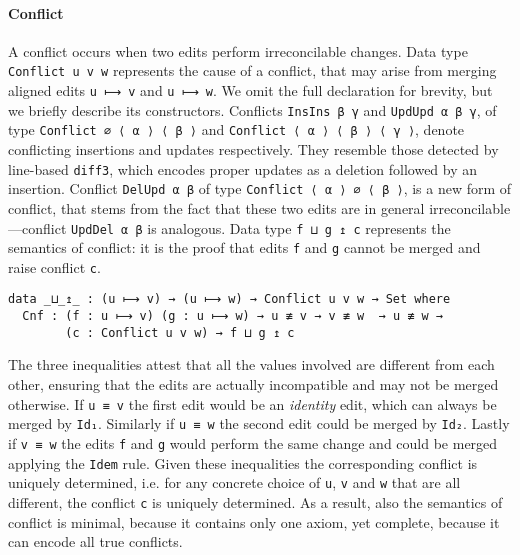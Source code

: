 \documentclass{sigplanconf}
\theoremstyle{plain}
\begin{document}
\paragraph{Conflict}
A conflict occurs when two edits perform irreconcilable changes.  
%
Data type \texttt{Conflict u v w} represents the cause of
a conflict, that may arise from merging aligned edits \texttt{u ⟼ v}
and \texttt{u ⟼ w}.
%
We omit the full declaration for brevity, but we briefly describe its
constructors.
%
Conflicts \texttt{InsIns β γ} and \texttt{UpdUpd α β γ}, of type
\texttt{Conflict ∅ ⟨ α ⟩ ⟨ β ⟩} and \texttt{Conflict ⟨ α ⟩ ⟨ β ⟩ ⟨ γ
  ⟩}, denote conflicting insertions and updates respectively.
%
They resemble those detected by line-based \texttt{diff3}, which
encodes proper updates as a deletion followed by an insertion.
%
Conflict \texttt{DelUpd α β} of type \texttt{Conflict ⟨ α ⟩ ∅ ⟨ β ⟩},
is a new form of conflict, that stems from the fact that these two
edits are in general irreconcilable ---conflict \texttt{UpdDel α β} is analogous.
%
Data type \texttt{f ⊔ g ↥ c} represents the semantics of conflict: it
is the proof that edits \texttt{f} and \texttt{g} cannot be merged and
raise conflict \texttt{c}.
\begin{verbatim}
data _⊔_↥_ : (u ⟼ v) → (u ⟼ w) → Conflict u v w → Set where
  Cnf : (f : u ⟼ v) (g : u ⟼ w) → u ≢ v → v ≢ w  → u ≢ w → 
        (c : Conflict u v w) → f ⊔ g ↥ c
\end{verbatim}
The three inequalities attest that all the values involved are
different from each other, ensuring that the edits are actually
incompatible and may not be merged otherwise. 
%
If \texttt{u ≡ v} the first edit would be an \emph{identity} edit,
which can always be merged by \texttt{Id₁}. Similarly if \texttt{u ≡
  w} the second edit could be merged by \texttt{Id₂}. Lastly if
\texttt{v ≡ w} the edits \texttt{f} and \texttt{g} would perform the
same change and could be merged applying the \texttt{Idem} rule.
%
Given these inequalities the corresponding conflict is uniquely
determined, i.e. for any concrete choice of \texttt{u}, \texttt{v} and
\texttt{w} that are all different, the conflict \texttt{c} is uniquely
determined.
%
As a result, also the semantics of conflict is minimal, because it
contains only one axiom, yet complete, because it can encode all true
conflicts.
\end{document}
